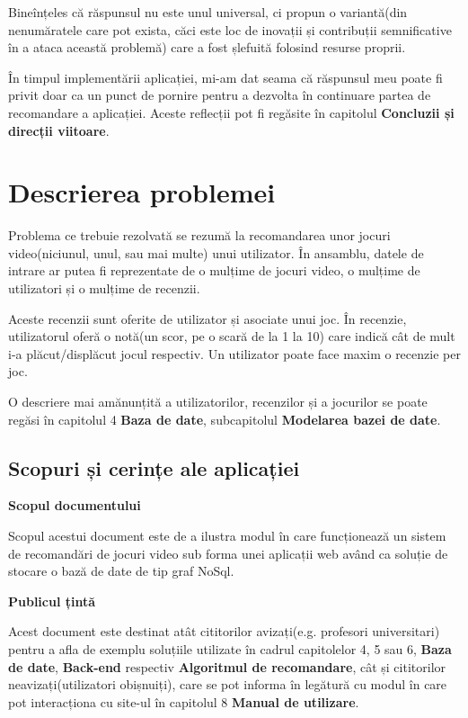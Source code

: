 \documentclass[12pt,a4paper]{report}
\begin{document}
Bineînțeles că răspunsul nu este unul universal, ci propun o variantă(din nenumăratele care pot exista, căci este loc de inovații și contribuții semnificative în a ataca această problemă) care a fost șlefuită folosind resurse proprii.

În timpul implementării aplicației, mi-am dat seama că răspunsul meu poate fi privit doar ca un punct de pornire pentru a dezvolta în continuare partea de recomandare a aplicației. Aceste reflecții pot fi regăsite în capitolul \textbf{Concluzii și direcții viitoare}.
	
	
\newpage
	
\setcounter{secnumdepth}{3} 
\renewcommand*\thesection{\arabic{section}}
\section{Descrierea problemei}

Problema ce trebuie rezolvată se rezumă la recomandarea unor jocuri video(niciunul, unul, sau mai multe) unui utilizator. În ansamblu, datele de intrare ar putea fi reprezentate de o mulțime de jocuri video, o mulțime de utilizatori și o mulțime de recenzii.

Aceste recenzii sunt oferite de utilizator și asociate unui joc. În recenzie, utilizatorul oferă o notă(un scor, pe o scară de la 1 la 10) care indică cât de mult i-a plăcut/displăcut jocul respectiv. Un utilizator poate face maxim o recenzie per joc.

O descriere mai amănunțită a utilizatorilor, recenzilor și a jocurilor se poate regăsi în capitolul 4 \textbf{Baza de date}, subcapitolul \textbf{Modelarea bazei de date}.

\subsection{Scopuri și cerințe ale aplicației}

\bigskip
\bigskip
\textbf{Scopul documentului}
\bigskip

Scopul acestui document este de a ilustra modul în care funcționează un sistem de recomandări de jocuri video sub forma unei aplicații web având ca soluție de stocare o bază de date de tip graf NoSql.

\bigskip
\textbf{Publicul țintă}
\bigskip

Acest document este destinat atât cititorilor avizați(e.g. profesori universitari) pentru a afla de exemplu soluțiile utilizate în cadrul capitolelor 4, 5 sau 6, \textbf{Baza de date}, \textbf{Back-end} respectiv \textbf{Algoritmul de recomandare}, cât și cititorilor neavizați(utilizatori obișnuiți), care se pot informa în legătură cu modul în care pot interacționa cu site-ul în capitolul 8 \textbf{Manual de utilizare}.
\end{document}

